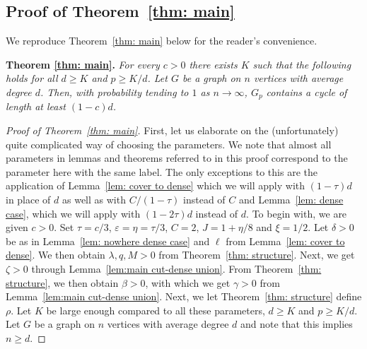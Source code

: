 \documentclass[10pt]{article}
\theoremstyle{definition}
\let\geq\geqslant
\begin{document}
\subsection{Proof of Theorem~\ref{thm: main}}
We reproduce Theorem~\ref{thm: main} below for the reader's convenience.
\vspace{2mm}

\noindent \textbf{Theorem \ref{thm: main}. }\textit{For every $c>0$ there exists $K$ such that the following holds for all $d\geq K$ and $p\geq K/d$. Let $G$ be a graph on $n$ vertices with average degree $d$. Then, with probability tending to $1$ as $n\to \infty$, $G_p$ contains a cycle of length at least $(1-c)d$.}

\begin{proof}[Proof of Theorem~\ref{thm: main}]
First, let us elaborate on the (unfortunately) quite complicated way of choosing the parameters. We note that almost all parameters in lemmas and theorems referred to in this proof correspond to the parameter here with the same label. The only exceptions to this are the application of Lemma~\ref{lem: cover to dense} which we will apply with $(1-\tau)d$ in place of $d$ as well as with $C/(1-\tau)$ instead of $C$ and Lemma~\ref{lem: dense case}, which we will apply with $(1-2\tau)d$ instead of $d$. To begin with, we are given $c>0$. Set $\tau = c/3$, $\varepsilon=\eta=\tau/3$, $C=2$, $J=1+\eta/8$ and $\xi = 1/2$. Let $\delta>0$ be as in Lemma~\ref{lem: nowhere dense case} and $\ell$ from Lemma~\ref{lem: cover to dense}. We then obtain $\lambda,q,M>0$ from Theorem~\ref{thm: structure}. Next, we get $\zeta>0$ through Lemma~\ref{lem:main cut-dense union}. From Theorem~\ref{thm: structure}, we then obtain $\beta>0$, with which we get $\gamma>0$ from Lemma~\ref{lem:main cut-dense union}. Next, we let Theorem~\ref{thm: structure} define $\rho$. Let $K$ be large enough compared to all these parameters, $d\geq K$ and $p\geq K/d$. Let $G$ be a graph on $n$ vertices with average degree $d$ and note that this implies $n\geq d$.


\end{proof}
\end{document}
